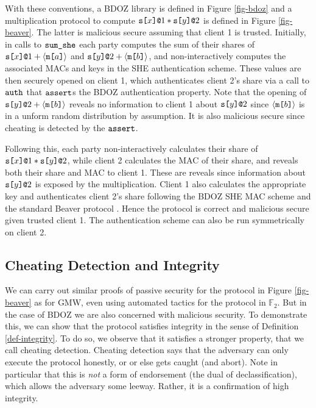 With these conventions, a BDOZ library is defined in Figure
\ref{fig-bdoz} and a multiplication protocol to compute $\texttt{s[}x\texttt{]}\texttt{@}1 *
\texttt{s[}y\texttt{]}\texttt{@}2$ is defined in Figure \ref{fig-beaver}. The latter is
malicious secure assuming that client 1 is trusted. Initially, in
calls to $\texttt{sum\_she}$ each party computes the sum of their shares
of $\texttt{s[}x\texttt{]}\texttt{@}1 + \langle \texttt{m[}a\texttt{]} \rangle$ and $\texttt{s[}y\texttt{]}\texttt{@}2 + \langle \texttt{m[}b\texttt{]} \rangle$,
and non-interactively computes the associated MACs and keys in the
SHE authentication scheme. These values are then
securely opened on client 1, which authenticates client
2's share via a call to $\texttt{auth}$ that $\texttt{assert}$s
the BDOZ authentication property. Note that the
opening of $\texttt{s[}y\texttt{]}\texttt{@}2 + \langle \texttt{m[}b\texttt{]} \rangle$ reveals no
information to client 1 about $\texttt{s[}y\texttt{]}\texttt{@}2$ since $\langle \texttt{m[}b\texttt{]} \rangle$ is
in a unform random distribution by assumption. It is
also malicious secure since cheating is detected
by the $\texttt{assert}$.

Following this, each party non-interactively calculates their share of
$\texttt{s[}x\texttt{]}\texttt{@}1 * \texttt{s[}y\texttt{]}\texttt{@}2$, while client 2 calculates the MAC of
their share, and reveals both their share and MAC to client 1. These
are reveals since information about $\texttt{s[}y\texttt{]}\texttt{@}2$ is exposed by
the multiplication.  Client 1 also calculates the appropriate key and
authenticates client 2's share following the BDOZ SHE MAC scheme
\cite{10.1007/978-3-030-68869-1_3} and the standard Beaver protocol
\cite{evans2018pragmatic}. Hence the protocol is correct and
malicious secure given trusted client 1. The authentication scheme
can also be run symmetrically on client 2.



\subsection{Cheating Detection and Integrity}

We can carry out similar proofs of passive security for the protocol
in Figure \ref{fig-beaver} as for GMW, even using automated tactics
for the protocol in $\mathbb{F}_2$. But in the case of BDOZ we are
also concerned with malicious security. To demonstrate this, we can
show that the protocol satisfies integrity in the sense of Definition
\ref{def-integrity}. To do so, we observe that it satisfies a stronger
property, that we call cheating detection. Cheating detection says
that the adversary can only execute the protocol honestly, or or else
gets caught (and abort). Note in particular that this is \emph{not}
a form of endorsement (the dual of declassification), which allows
the adversary some leeway. Rather, it is a confirmation of high integrity.

